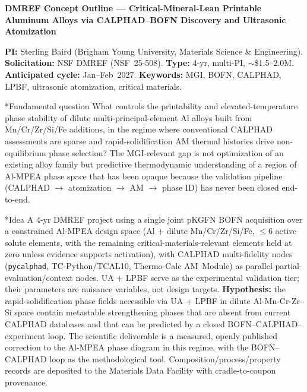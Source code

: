 \documentclass[10pt]{article}
\makeatletter
\renewcommand{\section}{\@startsection{section}{1}{0pt}{0.4ex plus 0.1ex}{0.15ex}{\normalfont\bfseries}}
\makeatother
\begin{document}
\begin{center}
{\bfseries DMREF Concept Outline --- Critical-Mineral-Lean Printable Aluminum Alloys via CALPHAD--BOFN Discovery and Ultrasonic Atomization}
\end{center}

{\small \textbf{PI:} Sterling Baird (Brigham Young University, Materials Science \& Engineering). \textbf{Solicitation:} NSF DMREF (NSF~25-508). \textbf{Type:} 4-yr, multi-PI, $\sim$\$1.5--2.0M. \textbf{Anticipated cycle:} Jan--Feb~2027. \textbf{Keywords:} MGI, BOFN, CALPHAD, LPBF, ultrasonic atomization, critical materials.}



\section*{Fundamental question}
What controls the printability and elevated-temperature phase stability of dilute multi-principal-element Al alloys built from Mn/Cr/Zr/Si/Fe additions, in the regime where conventional CALPHAD assessments are sparse and rapid-solidification AM thermal histories drive non-equilibrium phase selection? The MGI-relevant gap is not optimization of an existing alloy family but predictive thermodynamic understanding of a region of Al-MPEA phase space that has been opaque because the validation pipeline (CALPHAD $\to$ atomization $\to$ AM $\to$ phase ID) has never been closed end-to-end.

\section*{Idea}
A 4-yr DMREF project using a single joint pKGFN BOFN acquisition over a constrained Al-MPEA design space (Al + dilute Mn/Cr/Zr/Si/Fe, $\le$6 active solute elements, with the remaining critical-materials-relevant elements held at zero unless evidence supports activation), with CALPHAD multi-fidelity nodes (\texttt{pycalphad}, TC-Python/TCAL10, Thermo-Calc AM~Module) as parallel partial-evaluation/context nodes. UA + LPBF serve as the experimental validation tier; their parameters are nuisance variables, not design targets. \textbf{Hypothesis:} the rapid-solidification phase fields accessible via UA + LPBF in dilute Al-Mn-Cr-Zr-Si space contain metastable strengthening phases that are absent from current CALPHAD databases and that can be predicted by a closed BOFN--CALPHAD--experiment loop. The scientific deliverable is a measured, openly published correction to the Al-MPEA phase diagram in this regime, with the BOFN--CALPHAD loop as the methodological tool. Composition/process/property records are deposited to the Materials Data Facility with cradle-to-coupon provenance.
\end{document}

